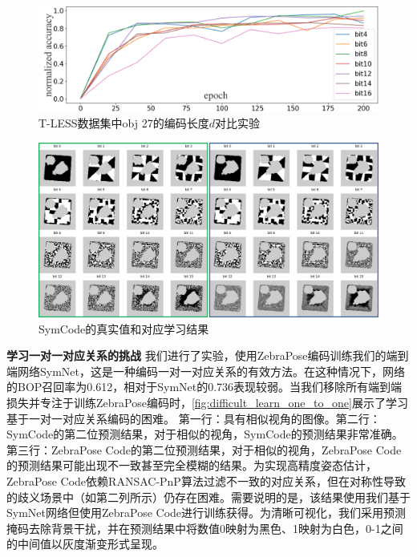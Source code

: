 \begin{figure}[ht]
        \centerline{\includegraphics[width=1.0\textwidth]{figure/symnet/ablation_bit.jpg}}
        \caption{T-LESS数据集中obj 27的编码长度$d$对比实验}
        \label{fig:ablation_bit}
\end{figure}

\begin{figure}[ht]
        \centerline{\includegraphics[width=1.0\textwidth]{figure/symnet/compare_gt_est.jpg}}
        \caption{SymCode的真实值和对应学习结果}
        \label{fig:compare_gt_est}
\end{figure}

\textbf{学习一对一对应关系的挑战 } 我们进行了实验，使用ZebraPose编码训练我们的端到端网络SymNet，这是一种编码一对一对应关系的有效方法。在这种情况下，网络的BOP召回率为0.612，相对于SymNet的0.736表现较弱。当我们移除所有端到端损失并专注于训练ZebraPose编码时，\autoref{fig:difficult_learn_one_to_one}展示了学习基于一对一对应关系编码的困难。 第一行：具有相似视角的图像。第二行：SymCode的第二位预测结果，对于相似的视角，SymCode的预测结果非常准确。第三行：ZebraPose Code的第二位预测结果，对于相似的视角，ZebraPose Code的预测结果可能出现不一致甚至完全模糊的结果。为实现高精度姿态估计，ZebraPose Code依赖RANSAC-PnP算法过滤不一致的对应关系，但在对称性导致的歧义场景中（如第二列所示）仍存在困难。需要说明的是，该结果使用我们基于SymNet网络但使用ZebraPose Code进行训练获得。为清晰可视化，我们采用预测掩码去除背景干扰，并在预测结果中将数值0映射为黑色、1映射为白色，0-1之间的中间值以灰度渐变形式呈现。

